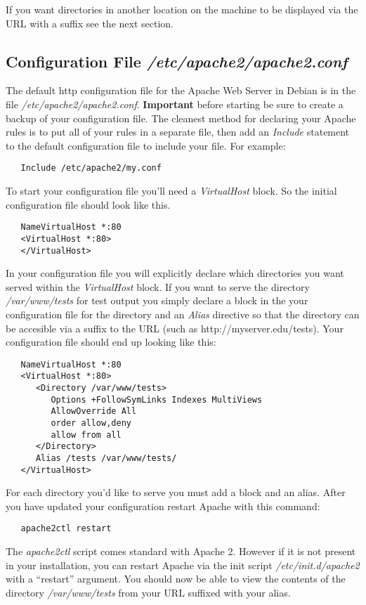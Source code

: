 \documentclass[12pt]{article}
\begin{document}
If you want directories in another location on the machine to be displayed via the URL with a suffix see the next section.

\subsection*{Configuration File {\it /etc/apache2/apache2.conf}}

The default http configuration file for the Apache Web Server in Debian is in the file {\it /etc/apache2/apache2.conf}.  \textbf{Important} before starting be sure to create a backup of your configuration file. The cleanest method for declaring your Apache rules is to put all of your rules in a separate file, then add an {\it Include} statement to the default configuration file to include your file. For example:
\begin{verbatim}
   Include /etc/apache2/my.conf
\end{verbatim}
To start your configuration file you'll need a {\it VirtualHost} block. So the initial configuration file should look like this.
\begin{verbatim}
   NameVirtualHost *:80
   <VirtualHost *:80>
   </VirtualHost>
\end{verbatim}
In your configuration file you will explicitly declare which directories you want served within the {\it VirtualHost} block. If you want to serve the directory {\it /var/www/tests} for test output you simply declare a block in the your configuration file for the directory and an {\it Alias} directive so that the directory can be accesible via a suffix to the URL (such as http://myserver.edu/tests). Your configuration file should end up looking like this:
\begin{verbatim}
   NameVirtualHost *:80
   <VirtualHost *:80>   
      <Directory /var/www/tests>
         Options +FollowSymLinks Indexes MultiViews
         AllowOverride All
         order allow,deny
         allow from all
      </Directory>
      Alias /tests /var/www/tests/
   </VirtualHost>
\end{verbatim}
For each directory you'd like to serve you must add a block and an alias. After you have updated your configuration restart Apache with this command:
\begin{verbatim}
   apache2ctl restart
\end{verbatim}
The \textit{apache2ctl} script comes standard with Apache 2. However if it is not present in your installation, you can restart Apache via the init script \textit{/etc/init.d/apache2} with a ``restart'' argument. You should now be able to view the contents of the directory {\it /var/www/tests} from your URL suffixed with your alias.
\end{document}
